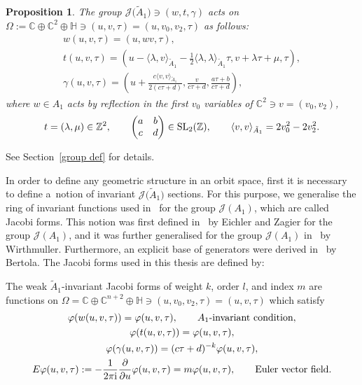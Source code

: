 \documentclass[10pt,a4paper]{amsart}
\numberwithin{equation}{section}
\newtheorem{Proposition}[Theorem]{Proposition}
 { \theoremstyle{definition}
\newtheorem{Definition}[Theorem]{Definition}
\newtheorem{Remark}[Theorem]{Remark} }
\newcommand{\Ja}{\mathcal{J}}
\begin{document}
 \begin{Proposition}
The group $\Ja\big(\tilde A_1\big)\ni (w,t,\gamma)$ acts on $\Omega:=\mathbb{C}\oplus \mathbb{C}^{2}\oplus \mathbb{H} \ni (u,v,\tau)=(u,v_0,v_2,\tau)$ as follows:
\begin{gather*}
w(u,v,\tau)=(u,wv,\tau),
\\
t(u,v,\tau)=\left(u- \langle \lambda,v \rangle_{\tilde A_1}-\frac{1}{2} \langle \lambda,\lambda \rangle_{\tilde A_1}\tau,v+\lambda\tau+\mu,\tau\right),
\\
\gamma(u,v,\tau)=\left(u+\frac{c \langle v,v \rangle_{\tilde A_1}}{2(c\tau+d)},\frac{v}{c\tau+d},\frac{a\tau+b}{c\tau+d}\right),
\end{gather*}
where $w \in A_1$ acts by reflection in the first $v_0$ variables of $ \mathbb{C}^{2} \ni v=(v_0,v_2)$,
\[
t=(\lambda,\mu) \in \mathbb{Z}^{2}, \qquad
\begin{pmatrix} a & b\\c & d\end{pmatrix} \in {\rm SL}_2(\mathbb{Z}),\qquad
\langle v,v \rangle_{\tilde A_1}=2v_0^2-2v_2^2.
\]
\end{Proposition}
See Section~\ref{group def} for details.

In order to define any geometric structure in an orbit space, first it is necessary to define a~notion of invariant $\Ja\big(\tilde A_1\big)$ sections. For this purpose, we generalise the ring of invariant functions used in~\cite{BertolaM.1, BertolaM.2} for the group $\Ja( A_1)$, which are called Jacobi forms. This notion was first defined in~\cite{M.EichlerandD.Zagier} by Eichler and Zagier for the group $\Ja(A_1)$, and it was further generalised for the group $\Ja( A_1)$ in~\cite{K.Wirthmuller} by Wirthmuller. Furthermore, an explicit base of generators were derived in~\cite{BertolaM.1, BertolaM.2} by Bertola. The Jacobi forms used in this thesis are defined by:

\begin{Definition}
The weak $\tilde A_1$-invariant Jacobi forms of weight $k$, order $l$, and index $m$ are functions on $\Omega=\mathbb{C}\oplus \mathbb{C}^{n+2}\oplus\mathbb{H}\ni (u,v_0,v_2,\tau)=(u,v,\tau)$ which satisfy
\begin{gather}
\varphi(w(u,v,\tau))=\varphi(u,v,\tau),\qquad \textrm{$A_1$-invariant condition},\nonumber
\\
\varphi(t(u,v,\tau))=\varphi(u,v,\tau),\nonumber
\\
\varphi(\gamma(u,v,\tau))=(c\tau+d)^{-k}\varphi(u,v,\tau),\nonumber
\\
E\varphi(u,v,\tau):=-\frac{1}{2\pi {\rm i}}\frac{\partial}{\partial u}\varphi(u,v,\tau)=m\varphi(u,v,\tau),\qquad \textrm{Euler vector field}.
\label{jacobiform in the introduction}
\end{gather}
\end{Definition}
\end{document}
